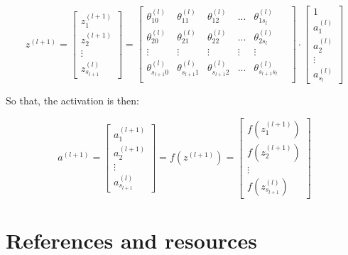 \documentclass[
  letterpaper,
  DIV=11,
  numbers=noendperiod,
  oneside]{scrartcl}
\begin{document}
\[
z^{(l+1)}=
\begin{bmatrix}
z_1^{(l+1)}\\
z_2^{(l+1)}\\
\vdots\\
z_{s_{l+1}}^{(l)}
\end{bmatrix}=
\begin{bmatrix}
\theta_{10}^{(l)}& \theta_{11}^{(l)}&\theta_{12}^{(l)}&...&\theta_{1s_{l}}^{(l)}&\\
\theta_{20}^{(l)}& \theta_{21}^{(l)}&\theta_{22}^{(l)}&...&\theta_{2s_{l}}^{(l)}&\\
\vdots & \vdots& \vdots & \vdots & \vdots\\
\theta_{s_{l+1}0}^{(l)}& \theta_{s_{l+1}1}^{(l)}&\theta_{s_{l+1}2}^{(l)}&...&\theta_{s_{l+1}s_{l}}^{(l)}&\\
\end{bmatrix}
\cdot\begin{bmatrix}
1\\
a_1^{(l)}\\
a_2^{(l)}\\
\vdots\\
a_{s_l}^{(l)}
\end{bmatrix}
\]

So that, the activation is then:

\[
a^{(l+1)}=
\begin{bmatrix}
a_1^{(l+1)}\\
a_2^{(l+1)}\\
\vdots\\
a_{s_{l+1}}^{(l)}
\end{bmatrix}=f(z^{(l+1)})=\begin{bmatrix}
f(z_1^{(l+1)})\\
f(z_2^{(l+1)})\\
\vdots\\
f(z_{s_{l+1}}^{(l)})
\end{bmatrix}
\]

\hypertarget{references-and-resources}{%
\section{References and resources}\label{references-and-resources}}
\end{document}
